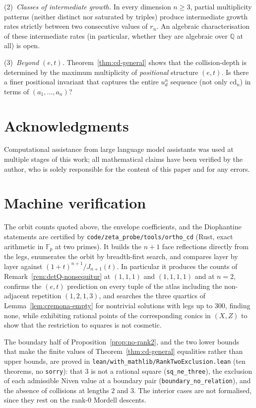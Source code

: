 \documentclass[11pt,a4paper]{article}
\theoremstyle{remark}
\theoremstyle{plain}
\begin{document}
(2)~\emph{Classes of intermediate growth.}  In every dimension
$n \ge 3$, partial multiplicity patterns (neither distinct nor
saturated by triples) produce intermediate growth rates strictly
between two consecutive values of $r_n$.  An algebraic
characterisation of these intermediate rates (in particular,
whether they are algebraic over $\mathbb{Q}$ at all) is open.

(3)~\emph{Beyond $(e, t)$.}  Theorem~\ref{thm:cd-general} shows that
the collision-depth is determined by the maximum multiplicity of
\emph{positional} structure $(e, t)$.  Is there a finer
positional invariant that captures the entire $u_d^n$ sequence (not
only $\mathrm{cd}_n$) in terms of $(a_1, \ldots, a_n)$?

\section*{Acknowledgments}

Computational assistance from large language model assistants was used
at multiple stages of this work; all mathematical claims have been
verified by the author, who is solely responsible for the content of
this paper and for any errors.


\section{Machine verification}\label{sec:lean}

The orbit counts quoted above, the envelope coefficients, and the
Diophantine statements are certified by
\texttt{code/zeta\_probe/tools/ortho\_cd} (Rust, exact arithmetic in
$\mathbb{F}_p$ at two primes). It builds the $n+1$ face reflections directly
from the legs, enumerates the orbit by breadth-first search, and compares layer
by layer against $(1+t)^{n+1}/J_{n+1}(t)$. In particular it produces the counts
of Remark~\ref{rem:detQ-nonsequitur} at $(1,1,1)$ and $(1,1,1,1)$ and at $n=2$,
confirms the $(e,t)$ prediction on every tuple of the atlas including the
non-adjacent repetition $(1,2,1,3)$, and searches the three quartics of
Lemma~\ref{lem:cremona-empty} for nontrivial solutions with legs up to $300$,
finding none, while exhibiting rational points of the corresponding conics in
$(X,Z)$ to show that the restriction to squares is not cosmetic.

The boundary half of Proposition~\ref{prop:no-rank2}, and the two lower bounds that make the
finite values of Theorem~\ref{thm:cd-general} equalities rather than upper bounds, are proved in
\texttt{lean/with\_mathlib/RankTwoExclusion.lean} (ten theorems, no \texttt{sorry}): that $3$ is
not a rational square (\texttt{sq\_ne\_three}), the exclusion of each admissible Niven value at a
boundary pair (\texttt{boundary\_no\_relation}), and the absence of collisions at lengths $2$
and $3$. The interior cases are not formalised, since they rest on the rank-$0$ Mordell descents.
\end{document}
